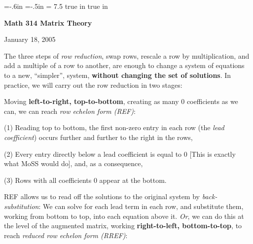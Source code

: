 
%



\voffset=-.6in
\hoffset=-.5in
\hsize = 7.5 true in
 true in




\nopagenumbers
\parindent=0pt

\overfullrule=0pt


\def\ctln{\centerline}
\def\u{\underbar}
\def\ssk{\smallskip}
\def\msk{\medskip}
\def\bsk{\bigskip}
\def\hsk{\hskip.1in}
\def\hhsk{\hskip.2in}
\def\dsl{\displaystyle}
\def\hskp{\hskip1.5in}

\def\lra{$\Leftrightarrow$ }





\ctln{\bf Math 314 Matrix Theory}

\ssk

\ctln{January 18, 2005}

\msk

The three  steps of {\it row reduction}, swap rows, rescale a row
by multiplication, and add a multiple of a row to another,
are enough to change a system of equations to a new,
``simpler'',  system, {\bf without changing the set of solutions}. In practice, 
we will carry out the row reduction in two stages:

\msk

Moving {\bf left-to-right, top-to-bottom}, creating as many $0$ coefficients 
as we can, we can reach {\it row echelon form (REF)}:

\msk

(1) Reading top to bottom, the first non-zero entry in each row (the {\it lead coefficient}) 
occurs further and further to the right in the rows,

\ssk

(2) Every entry directly below a lead coefficient is equal to 0 [This is exactly what MoSS
would do], and, as a consequence,

\ssk

(3) Rows with all coefficients 0 appear at the bottom.

\msk

REF allows us to read off the solutions to the original system by {\it back-substitution}:
We can solve for each lead term in each row, and substitute them, working from bottom to
top, into each equation above it. {\it Or}, we can do this at the level of the augmented matrix,
working {\bf right-to-left, bottom-to-top}, to reach {\it reduced row echelon form (RREF)}:

